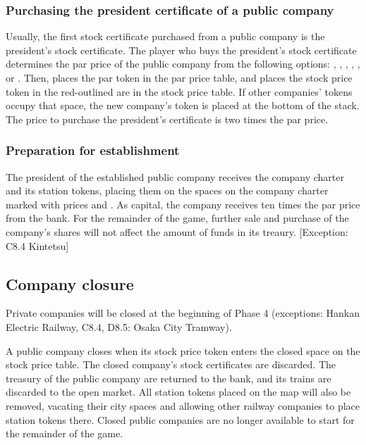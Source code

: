 \documentclass{article}
\begin{document}
\begin{CJK}{UTF8}{min}
\subsubsection{Purchasing the president certificate of a public company}
Usually, the first stock certificate purchased from a public company
is the president's stock certificate. The player who buys the
president's stock certificate determines the par price of the public
company from the following options: , , , , , or . Then, places the par token in the par price
table, and places the stock price token in the red-outlined are in the
stock price table. If other companies' tokens occupy that space, the
new company's token is placed at the bottom of the stack. The price to
purchase the president's certificate is two times the par price.

\subsubsection{Preparation for establishment}
The president of the established public company receives the company
charter and its station tokens, placing them on the spaces on the
company charter marked with prices  and . As capital,
the company receives ten times the par price from the bank. For the
remainder of the game, further sale and purchase of the company's
shares will not affect the amount of funds in its treaury. [Exception:
C8.4 Kintetsu]

\subsection{Company closure}
Private companies will be closed at the beginning of Phase 4
(exceptions: Hankan Electric Railway, C8.4, D8.5: Osaka City Tramway).

A public company closes when its stock price token enters the closed
space on the stock price table. The closed company's stock
certificates are discarded. The treasury of the public company are
returned to the bank, and its trains are discarded to the open
market. All station tokens placed on the map will also be removed,
vacating their city spaces and allowing other railway companies to
place station tokens there. Closed public companies are no longer
available to start for the remainder of the game.





\end{CJK}
\end{document}
